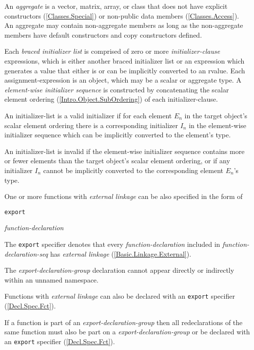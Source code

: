 
\p An \textit{aggregate} is a vector, matrix, array, or class that does not have
explicit constructors (\ref{Classes.Special}) or non-public data members
(\ref{Classes.Access}). An aggregate may contain non-aggregate members as long
as the non-aggregate members have default constructors and copy constructors
defined.

\p Each \textit{braced initializer list} is comprised of zero or more
\textit{initializer-clause} expressions, which is either another braced
initializer list or an expression which generates a value that either is or can
be implicitly converted to an rvalue. Each assignment-expression is an object,
which may be a scalar or aggregate type. A \textit{element-wise initializer
sequence} is constructed by concatenating the scalar element ordering
(\ref{Intro.Object.SubOrdering}) of each initializer-clause.

\p An initializer-list is a valid initializer if for each element \(E_n\) in the
target object's scalar element ordering there is a corresponding initializer
\(I_n\) in the element-wise initializer sequence which can be implicitly
converted to the element's type.

\p An initializer-list is invalid if the element-wise initializer sequence
contains more or fewer elements than the target object's scalar element
ordering, or if any initializer \(I_n\) cannot be implicitly converted to the
corresponding element \(E_n\)'s type.



\p One or more functions with \textit{external linkage} can be also specified in the form of

\begin{grammar}
  \br
  \texttt{export} \terminal{\{}  \terminal{\}}\br

  \br
  \textit{function-declaration} 
\end{grammar}

\p The \texttt{export} specifier denotes that every \textit{function-declaration} included in \textit{function-declaration-seq} has \textit{external linkage} (\ref{Basic.Linkage.External}).

\p The \textit{export-declaration-group} declaration cannot appear directly or indirectly within an unnamed namespace.

\p Functions with \textit{external linkage} can also be declared with an \texttt{export} specifier (\ref{Decl.Spec.Fct}).

\p If a function is part of an \textit{export-declaration-group} then all redeclarations of the same function must also be part on a \textit{export-declaration-group} or be declared with an \texttt{export} specifier (\ref{Decl.Spec.Fct}).
